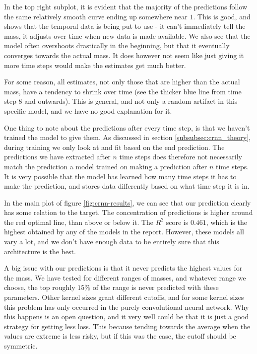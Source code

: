 \documentclass[a4paper]{article}
\begin{document}
In the top right subplot, it is evident that the majority of the predictions follow the same relatively smooth curve ending up somewhere near $1$. This is good, and shows that the temporal data is being put to use - it can't immediately tell the mass, it adjusts over time when new data is made available. We also see that the model often overshoots drastically in the beginning, but that it eventually converges towards the actual mass. It does however not seem like just giving it more time steps would make the estimates get much better.

For some reason, all estimates, not only those that are higher than the actual mass, have a tendency to shrink over time (see the thicker blue line from time step 8 and outwards). This is general, and not only a random artifact in this specific model, and we have no good explanation for it.

One thing to note about the predictions after every time step, is that we haven't trained the model to give them. As discussed in section \ref{subsubsec:crnn_theory}, during training we only look at and fit based on the end prediction. The predictions we have extracted after $n$ time steps does therefore not necessarily match the prediction a model trained on making a prediction after $n$ time steps. It is very possible that the model has learned how many time steps it has to make the prediction, and stores data differently based on what time step it is in.

In the main plot of figure \ref{fig:crnn-results}, we can see that our prediction clearly has some relation to the target. The concentration of predictions is higher around the red optimal line, than above or below it. The $R^2$ score is $0.461$, which is the highest obtained by any of the models in the report. However, these models all vary a lot, and we don't have enough data to be entirely sure that this architecture is the best.

A big issue with our predictions is that it never predicts the highest values for the mass. We have tested for different ranges of masses, and whatever range we choose, the top roughly $15\%$ of the range is never predicted with these parameters. Other kernel sizes grant different cutoffs, and for some kernel sizes this problem has only occurred in the purely convolutional neural network. Why this happens is an open question, and it very well could be that it is just a good strategy for getting less loss. This because tending towards the average when the values are extreme is less risky, but if this was the case, the cutoff should be symmetric.
\end{document}

